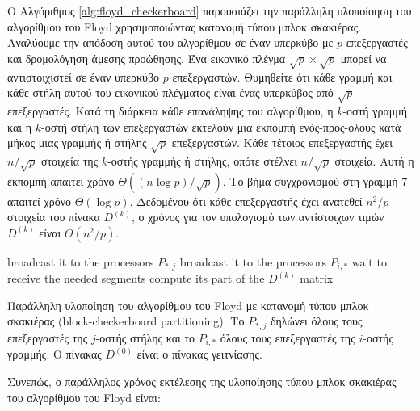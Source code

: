 \documentclass[12pt,a4paper]{article}
\begin{document}
Ο Αλγόριθμος \ref{alg:floyd_checkerboard} παρουσιάζει την παράλληλη υλοποίοηση του αλγορίθμου του \foreignlanguage{english}{Floyd} χρησιμοποιώντας κατανομή τύπου μπλοκ σκακιέρας. Αναλύουμε την απόδοση αυτού του αλγορίθμου σε έναν υπερκύβο με $p$ επεξεργαστές και δρομολόγηση άμεσης προώθησης. Ένα εικονικό πλέγμα $\sqrt{p} \times \sqrt{p}$ μπορεί να αντιστοιχιστεί σε έναν υπερκύβο $p$ επεξεργαστών. Θυμηθείτε ότι κάθε γραμμή και κάθε στήλη αυτού του εικονικού πλέγματος είναι ένας υπερκύβος από $\sqrt{p}$ επεξεργαστές. 
Κατά τη διάρκεια κάθε επανάληψης του αλγορίθμου, η $k$-οστή γραμμή και η $k$-οστή στήλη των επεξεργαστών εκτελούν μια εκπομπή ενός-προς-όλους κατά μήκος μιας γραμμής ή στήλης $\sqrt{p}$ επεξεργαστών. Κάθε τέτοιος επεξεργαστής έχει $n / \sqrt{p}$ στοιχεία της $k$-οστής γραμμής ή στήλης, οπότε στέλνει $n / \sqrt{p}$ στοιχεία. Αυτή η εκπομπή απαιτεί χρόνο $\Theta\!\left({(n \log p)}/{\sqrt{p}}\right)$. 
Το βήμα συγχρονισμού στη γραμμή 7 απαιτεί χρόνο $\Theta(\log p)$. Δεδομένου ότι κάθε επεξεργαστής έχει ανατεθεί $n^2 / p$ στοιχεία του πίνακα $D^{(k)}$, ο χρόνος για τον υπολογισμό των αντίστοιχων τιμών $D^{(k)}$ είναι $\Theta\!\left({n^2}/{p}\right)$. 


\begin{algorithm}[H]
\begin{algorithmic}[1]
            \State broadcast it to the processors $P_{*,j}$
        \EndFor
            \State broadcast it to the processors $P_{i,*}$
        \EndFor
            \State wait to receive the needed segments
        \EndFor
            \State compute its part of the $D^{(k)}$ matrix
        \EndFor
    \EndFor
\EndProcedure
\end{algorithmic}
\end{algorithm}


{\raggedright{} Παράλληλη υλοποίηση του αλγορίθμου του \foreignlanguage{english}{Floyd} με κατανομή τύπου μπλοκ σκακιέρας (\foreignlanguage{english}{block-checkerboard partitioning}). Το $P_{*,j}$ δηλώνει όλους τους επεξεργαστές της $j$-οστής στήλης και το $P_{i,*}$ όλους τους επεξεργαστές της $i$-οστής γραμμής. Ο πίνακας $D^{(0)}$ είναι ο πίνακας γειτνίασης.\label{alg:floyd_checkerboard}\par}
\vspace{0.3cm}
Συνεπώς, ο παράλληλος χρόνος εκτέλεσης της υλοποίησης τύπου μπλοκ σκακιέρας του αλγορίθμου του \foreignlanguage{english}{Floyd} είναι:
\end{document}
